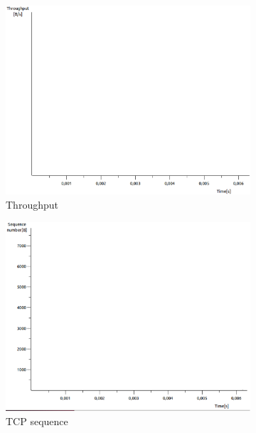 \documentclass[conference,a4paper]{IEEEtran}
\begin{document}
\begin{figure}
 \centering
 \begin{subfigure}[b]{0.2\textwidth}
  \includegraphics[width=\textwidth]{s5-3_th}
  \caption{Throughput}
 \end{subfigure}
 \begin{subfigure}[b]{0.2\textwidth}
  \includegraphics[width=\textwidth]{s5-3_seq}
  \caption{TCP sequence}
 \end{subfigure}
 \begin{subfigure}[b]{0.2\textwidth}

\end{subfigure}
\end{figure}
\end{document}
